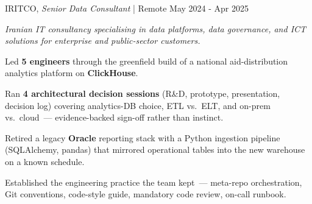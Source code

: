 \begin{cventries2}
  \cventrynew
    {IRITCO, \textnormal{\textit{Senior Data Consultant} | Remote}}
    {May 2024 - Apr 2025}
    {
      {\small\itshape Iranian IT consultancy specialising in data platforms, data governance, and ICT solutions for enterprise and public-sector customers.}\par\vspace{4mm}
      \begin{cvitems}
        \item Led {\bf 5 engineers} through the greenfield build of a national aid-distribution analytics platform on {\bf ClickHouse}.
        \item Ran {\bf 4 architectural decision sessions} (R\&D, prototype, presentation, decision log) covering analytics-DB choice, ETL vs.\ ELT, and on-prem vs.\ cloud~--- evidence-backed sign-off rather than instinct.
        \item Retired a legacy {\bf Oracle} reporting stack with a Python ingestion pipeline (SQLAlchemy, pandas) that mirrored operational tables into the new warehouse on a known schedule.
        \item Established the engineering practice the team kept~--- meta-repo orchestration, Git conventions, code-style guide, mandatory code review, on-call runbook.
      \end{cvitems}
    }


\end{cventries2}
